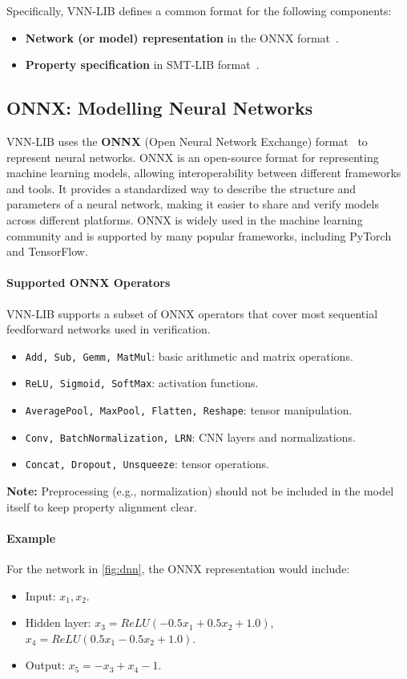 Specifically, VNN-LIB defines a common format for the following components:
\begin{itemize}
    \item \textbf{Network (or model) representation} in the ONNX format~\cite{onnx}.
    \item \textbf{Property specification} in SMT-LIB format~\cite{barrett2010smt}.
\end{itemize}

\subsection{ONNX: Modelling Neural Networks}

VNN-LIB uses the \textbf{ONNX} (Open Neural Network Exchange) format~\cite{onnx} to represent neural networks. ONNX is an open-source format for representing machine learning models, allowing interoperability between different frameworks and tools. It provides a standardized way to describe the structure and parameters of a neural network, making it easier to share and verify models across different platforms.
ONNX is widely used in the machine learning community and is supported by many popular frameworks, including PyTorch and TensorFlow.


\paragraph{Supported ONNX Operators} VNN-LIB supports a subset of ONNX operators that cover most sequential feedforward networks used in verification.

\begin{itemize}
    \item \texttt{Add, Sub, Gemm, MatMul}: basic arithmetic and matrix operations.
    \item \texttt{ReLU, Sigmoid, SoftMax}: activation functions.
    \item \texttt{AveragePool, MaxPool, Flatten, Reshape}: tensor manipulation.
    \item \texttt{Conv, BatchNormalization, LRN}: CNN layers and normalizations.
    \item \texttt{Concat, Dropout, Unsqueeze}: tensor operations.
\end{itemize}

\textbf{Note:} Preprocessing (e.g., normalization) should not be included in the model itself to keep property alignment clear.

\paragraph{Example} For the network in \autoref{fig:dnn}, the ONNX representation would include:
\begin{itemize}
    \item Input: $x_1, x_2$.
    \item Hidden layer: $x_3 = ReLU(-0.5x_1 + 0.5x_2 + 1.0)$, $x_4 = ReLU(0.5x_1 - 0.5x_2 + 1.0)$.
    \item Output: $x_5 = -x_3 + x_4 - 1$.
\end{itemize}



